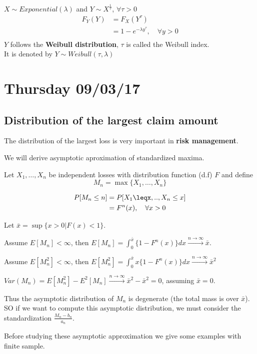 \documentclass[11pt,a4paper,oneside]{article}\usepackage[]{graphicx}\usepackage[]{color}
\begin{document}
$X\sim Exponential (\lambda)$ and $Y\sim X^{\frac{1}{\tau}}$, $\forall \tau>0$
\begin{align*}
F_Y(Y) &= F_X(Y^{\tau})\\
&=1-e^{-\lambda y^{\tau}}, \quad \forall y>0\\
\end{align*}
$Y$ follows the \textbf{Weibull distribution}, $\tau$ is called the Weibull index.\\ It is denoted by $Y\sim Weibull(\tau,\lambda)$


\section{Thursday 09/03/17}

\subsection{Distribution of the largest claim amount}

The distribution of the largest loss is very important in \textbf{risk management}.

We will derive asymptotic aproximation of standardized maxima.

Let $X_1,\ldots,X_n$ be independent losses with distribution function (d.f) $F$ and define 
\[M_n=\max\{X_1,\ldots,X_n\}\]

\begin{align*}
P[M_n\leq n] &= P[X_1\leqx,..,X_n\leq x]\\
&=F^n(x), \quad  \forall x>0\\
\end{align*}

Let $\bar{x}=\sup\{x>0|F(x)<1\}$.

Assume $E[M_n]<\infty$, then $E[M_n]=\displaystyle\int_{0}^{\bar{x}}\{1-F^n(x)\}dx\xrightarrow{n\rightarrow \infty}{\bar{x}}$.

Assume $E[M^2_n]<\infty$, then $E[M_n^2]=\displaystyle\int_{0}^{\bar{x}}x\{1-F^n(x)\}dx\xrightarrow{n\rightarrow \infty}{\bar{x}^2}$

$Var(M_n)=E[M^2_n]-E^2[M_n]\xrightarrow{n\rightarrow \infty}{\bar{x}^2-\bar{x}^2}=0$, assuming $\bar{x}=0$.\newline

Thus the asymptotic distribution of $M_n$ is degenerate (the total mass is over $\bar{x}$). SO if we want to compute this asymptotic distribution, we must consider the standardization $\frac{M_n-b_n}{a_n}$.

Before studying these asymptotic approximation we give some examples with finite sample.
\end{document}
